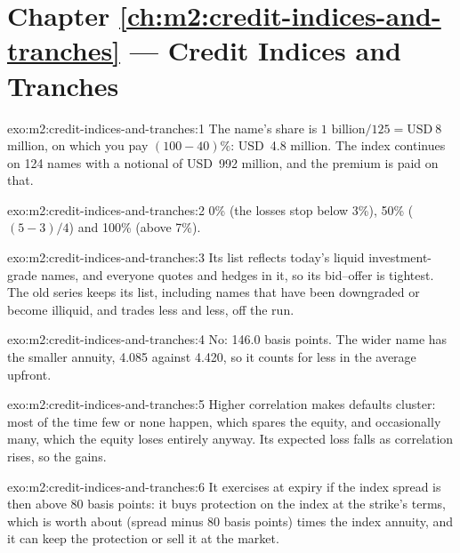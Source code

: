 \section*{Chapter \ref{ch:m2:credit-indices-and-tranches} --- Credit Indices and Tranches}

\begin{solution}{exo:m2:credit-indices-and-tranches:1}
The name's share is $1\text{ billion}/125 = \text{USD}~8$ million, on which you pay
$(100 - 40)\% $: USD~4.8 million. The index continues on 124 names with a notional of
USD~992 million, and the premium is paid on that.
\end{solution}

\begin{solution}{exo:m2:credit-indices-and-tranches:2}
0\% (the losses stop below 3\%), 50\% ($(5-3)/4$) and 100\% (above 7\%).
\end{solution}

\begin{solution}{exo:m2:credit-indices-and-tranches:3}
Its list reflects today's liquid investment-grade names, and everyone quotes and hedges
in it, so its bid--offer is tightest. The old series keeps its list, including names
that have been downgraded or become illiquid, and trades less and less, off the run.
\end{solution}

\begin{solution}{exo:m2:credit-indices-and-tranches:4}
No: 146.0 basis points. The wider name has the smaller annuity, 4.085 against 4.420,
so it counts for less in the average upfront.
\end{solution}

\begin{solution}{exo:m2:credit-indices-and-tranches:5}
Higher correlation makes defaults cluster: most of the time few or none happen, which
spares the equity, and occasionally many, which the equity loses entirely anyway. Its
expected loss falls as correlation rises, so the  gains.
\end{solution}

\begin{solution}{exo:m2:credit-indices-and-tranches:6}
It exercises at expiry if the index spread is then above 80 basis points: it buys
protection on the index at the strike's terms, which is worth about (spread minus 80
basis points) times the index annuity, and it can keep the protection or sell it at
the market.
\end{solution}

